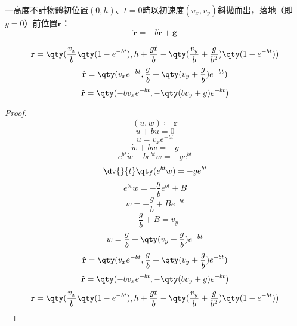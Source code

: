\documentclass[a4paper,12pt]{article}
\begin{document}
一高度不計物體初位置$(0,h)$、$t=0$時以初速度$(v_x,v_y)$斜拋而出，落地（即$y=0$）前位置$\mathbf{r}$：
\[\ddot{\mathbf{r}}=-b\dot{\mathbf{r}}+\mathbf{g}\]

\[\mathbf{r}=\qty(\frac{v_x}{b}\qty(1-e^{-bt}),h+\frac{gt}{b}-\qty(\frac{v_y}{b}+\frac{g}{b^2})\qty(1-e^{-bt}))\]
\[\dot{\mathbf{r}}=\qty(v_xe^{-bt},\frac{g}{b}+\qty(v_y+\frac{g}{b})e^{-bt})\]
\[\ddot{\mathbf{r}}=\qty(-bv_xe^{-bt},-\qty(bv_y+g)e^{-bt})\]
\begin{proof}
\[(u,w)\coloneq\dot{\mathbf{r}}\]
\[\dot{u}+bu=0\]
\[u=v_xe^{-bt}\]
\[\dot{w}+bw=-g\]
\[e^{bt}\dot{w}+be^{bt}w=-ge^{bt}\]
\[\dv{}{t}\qty(e^{bt}w)=-ge^{bt}\]
\[e^{bt}w=-\frac{g}{b}e^{bt}+B\]
\[w=-\frac{g}{b}+Be^{-bt}\]
\[-\frac{g}{b}+B=v_y\]
\[w=\frac{g}{b}+\qty(v_y+\frac{g}{b})e^{-bt}\]
\[\dot{\mathbf{r}}=\qty(v_xe^{-bt},\frac{g}{b}+\qty(v_y+\frac{g}{b})e^{-bt})\]
\[\ddot{\mathbf{r}}=\qty(-bv_xe^{-bt},-\qty(bv_y+g)e^{-bt})\]
\[\mathbf{r}=\qty(\frac{v_x}{b}\qty(1-e^{-bt}),h+\frac{gt}{b}-\qty(\frac{v_y}{b}+\frac{g}{b^2})\qty(1-e^{-bt}))\]
\end{proof}
\end{document}
